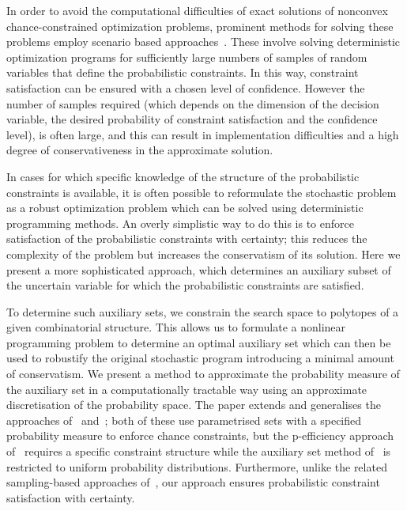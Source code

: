 \documentclass[letterpaper, 10pt, conference]{ieeeconf} %
\begin{document}
In order to avoid the computational difficulties of exact solutions of nonconvex chance-constrained optimization problems, prominent methods for solving these problems employ scenario based approaches~\cite{campi08,calafiore2010}. These involve solving deterministic optimization programs for sufficiently large numbers of samples of random variables that define the probabilistic constraints.
%
In this way, constraint satisfaction can be ensured with a chosen level of confidence. However the number of samples required (which depends on the dimension of the decision variable, the desired probability of constraint satisfaction and the confidence level), is often large, and this can result in implementation difficulties and a high degree of conservativeness in the approximate solution.  
%

In cases for which specific knowledge of the structure of the probabilistic constraints is available, it is often possible to reformulate the stochastic problem as a robust optimization problem which can be solved using deterministic programming methods.
%
An overly simplistic way to do this is to enforce satisfaction of the probabilistic constraints with certainty; this reduces the complexity of the problem but increases the conservatism of its solution.
%
Here we present a more sophisticated approach, which determines an auxiliary subset of the uncertain variable for which the probabilistic constraints are satisfied.
%

To determine such auxiliary sets, we constrain the search space to polytopes of a given combinatorial structure.
%
This allows us to formulate a nonlinear programming problem to determine an optimal auxiliary set which can then be used to robustify the original stochastic program introducing a minimal amount of conservatism.
%
We present a method to approximate the probability measure of the auxiliary set in a computationally tractable way using an approximate discretisation of the probability space. 
%
The paper extends and generalises the approaches of~\cite{Dentcheva2009} and~\cite{Schaich:2017}; both of these use parametrised sets with a specified probability measure to enforce chance constraints, but the p-efficiency approach of~\cite{Dentcheva2009} requires a specific constraint structure while the auxiliary set method of~\cite{Schaich:2017} is restricted to uniform probability distributions. Furthermore, unlike the related sampling-based approaches of~\cite{Zhang2015,Margellos:2014}, our approach ensures probabilistic constraint satisfaction with certainty.
\end{document}
